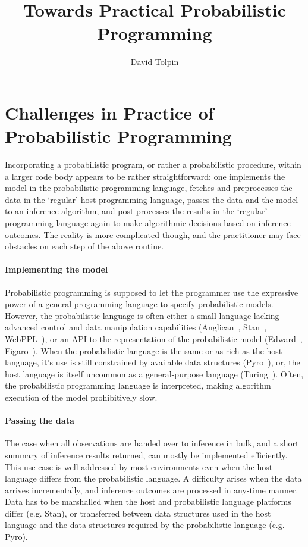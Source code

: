 \documentclass[sigplan,review]{acmart}\settopmatter{printfolios=true,printccs=false,printacmref=false}
\begin{document}
\title{Towards Practical Probabilistic Programming}
\author{David Tolpin}


\maketitle

\section{Challenges in Practice of Probabilistic Programming}

Incorporating a probabilistic program, or rather a probabilistic
procedure, within a larger code body appears to be rather
straightforward: one implements the model in the probabilistic
programming language, fetches and preprocesses the data in the
`regular' host programming language, passes the data and the
model to an inference algorithm, and post-processes the results
in the `regular' programming language again to make algorithmic
decisions based on inference outcomes. The reality is more
complicated though, and the practitioner may face obstacles on
each step of the above routine.

\paragraph{Implementing the model} Probabilistic programming is
supposed to let the programmer use the expressive power of a
general programming language to specify probabilistic models.
However, the probabilistic language is often either a small
language lacking advanced control and data manipulation
capabilities (Anglican~\cite{TMY+16}, Stan~\cite{Stan17},
WebPPL~\cite{GS15}),
or an API to the representation of the probabilistic model
(Edward~\cite{THS+17}, Figaro~\cite{P09}). When the probabilistic
language is the same or as rich as the host language, it's use
is still constrained by available data structures
(Pyro~\cite{Pyro18}), or, the host language is itself uncommon as a
general-purpose language (Turing~\cite{GXG18}). Often, the
probabilistic programming language is interpreted, making
algorithm execution of the model prohibitively slow.

\paragraph{Passing the data} The case when all observations are
handed over to inference in bulk, and a short summary of
inference results returned, can mostly be implemented
efficiently. This use case is well addressed by most
environments even when the host language differs from the
probabilistic language. A difficulty arises when
the data arrives incrementally, and inference outcomes are
processed in any-time manner. Data has to be marshalled when the
host and probabilistic language platforms differ (e.g.
Stan), or transferred between data structures used in
the host language and the data structures required by the
probabilistic language (e.g. Pyro).
\end{document}
